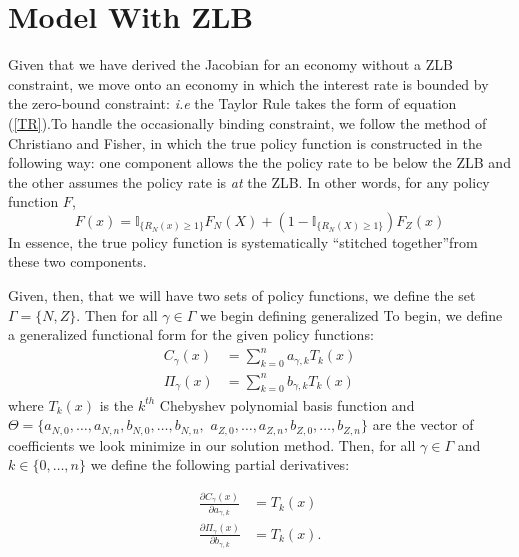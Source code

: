 \documentclass[11pt]{article}
\begin{document}
\section{Model With ZLB}
Given that we have derived the Jacobian for an economy without a ZLB constraint, we move onto an economy in which the interest rate is bounded by the zero-bound constraint: \emph{i.e} the Taylor Rule takes the form of equation (\ref{TR}).To handle the occasionally binding constraint, we follow the method of Christiano and Fisher, in which the true policy function is constructed in the following way: one component allows the the policy rate to be below the ZLB and the other assumes the policy rate is \emph{at} the ZLB. In other words, for any policy function $F$,
\begin{equation}
F(x) = \mathbb{I}_{\{R_N(x)\ge 1\}}F_{N}(X) + (1-\mathbb{I}_{\{R_N(X)\ge 1\}})F_{Z}(x)
\end{equation}
In essence, the true policy function is systematically ``stitched together''from these two components. 

Given, then, that we will have two sets of policy functions, we define the set $\Gamma = \{N,Z\}$. Then for all $\gamma\in\Gamma$ we begin defining generalized To begin, we define a generalized functional form for the given policy functions:
\begin{align}
C_{\gamma}(x) &= \sum_{k=0}^{n}a_{\gamma,k}T_k(x) \\ 
\Pi_{\gamma}(x) &= \sum_{k=0}^{n}b_{\gamma,k}T_k(x)
\end{align}
where $T_k(x)$ is the $k^{th}$ Chebyshev polynomial basis function and $\Theta = \{a_{N,0},\dots,a_{N,n},b_{N,0},\dots,b_{N,n},$ $a_{Z,0},\dots,a_{Z,n},b_{Z,0},\dots,b_{Z,n}\}$ are the vector of coefficients we look minimize in our solution method. Then, for all $\gamma\in\Gamma$ and $k\in\{0,\dots,n\}$ we define the following partial derivatives:

\begin{align}
\frac{\partial C_{\gamma}(x)}{\partial a_{\gamma,k}} &= T_k(x) \\ 
\frac{\partial \Pi_{\gamma}(x)}{\partial b_{\gamma,k}} &= T_k(x).
\end{align}
\end{document}
